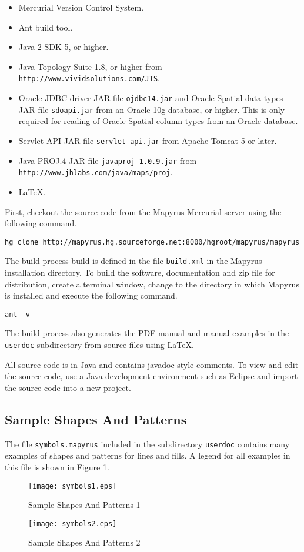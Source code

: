 \begin{itemize}
\item
Mercurial Version Control System.
\item
Ant build tool.
\item
Java 2 SDK 5, or higher.
\item
Java Topology Suite 1.8, or higher from \texttt{http://www.vividsolutions.com/JTS}.
\item
Oracle JDBC driver JAR file \texttt{ojdbc14.jar} and Oracle
Spatial data types JAR file \texttt{sdoapi.jar} from an
Oracle 10g database, or higher.  This is only required for reading
of Oracle Spatial column types from an Oracle database.
\item
Servlet API JAR file \texttt{servlet-api.jar} from Apache Tomcat 5
or later.
\item
Java PROJ.4 JAR file \texttt{javaproj-1.0.9.jar} from 
\texttt{http://www.jhlabs.com/java/maps/proj}.
\item
\LaTeX.
\end{itemize}

First, checkout the source code from the Mapyrus Mercurial server
using the following command.

\begin{verbatim}
hg clone http://mapyrus.hg.sourceforge.net:8000/hgroot/mapyrus/mapyrus
\end{verbatim}

The build process build is defined in the file \texttt{build.xml} in the
Mapyrus installation directory.  To build the software, documentation and zip
file for distribution, create a terminal window, change to the directory in
which Mapyrus is installed and execute the following command.

\begin{verbatim}
ant -v
\end{verbatim}

The build process also generates the PDF manual and manual examples in the
\texttt{userdoc} subdirectory from source files using \LaTeX.

All source code is in Java and contains javadoc style comments.  To view and
edit the source code, use a Java development environment such as Eclipse and
import the source code into a new project.


\subsection{Sample Shapes And Patterns}
The file \texttt{symbols.mapyrus} included in the subdirectory
\texttt{userdoc} contains many examples of shapes and patterns
for lines and fills.  A legend for all examples in this file is shown
in Figure \ref{samplesymbols}.

\begin{figure}[htb]
\label{samplesymbols}
\texttt{[image: symbols1.eps]}
\caption{Sample Shapes And Patterns 1}
\end{figure}

\begin{figure}[htb]
\texttt{[image: symbols2.eps]}
\caption{Sample Shapes And Patterns 2}
\end{figure}

